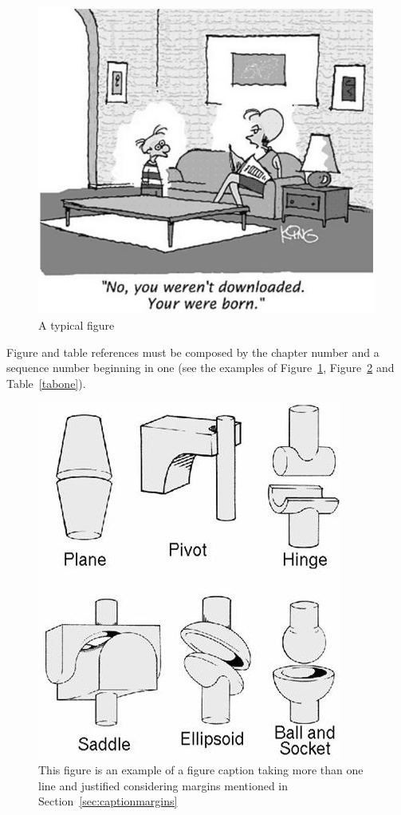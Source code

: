 \documentclass{SBCbookchapter}
\begin{document}
\begin{figure}[h!]
	\centerline{\includegraphics{fig1}}
	\caption{A typical figure}
	\label{figone}
\end{figure}



Figure and table references must be composed by the chapter number and
a sequence number beginning in one (see the examples of
Figure~\ref{figone}, Figure~\ref{figtwo} and Table~\ref{tabone}).

\begin{figure}[h!]
	\centerline{\includegraphics{fig2}}
	\caption{This figure is an example of a figure caption taking
		more than one line and justified considering margins
		mentioned in Section~\ref{sec:captionmargins}}
	\label{figtwo}
\end{figure}
\end{document}
